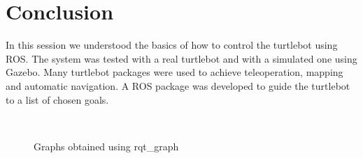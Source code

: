 \documentclass[11pt,oneside,a4paper]{article}
\begin{document}
\section{Conclusion}

In this session we understood the basics of how to control the turtlebot using ROS. The system was tested with a real turtlebot and with a simulated one using Gazebo. Many turtlebot packages were used to achieve teleoperation, mapping and automatic navigation. A ROS package was developed to guide the turtlebot to a list of chosen goals.





\begin{figure}
	\centering
	\\
	\caption{Graphs obtained using rqt\_graph}
	\label{graphs}
\end{figure}
\end{document}
